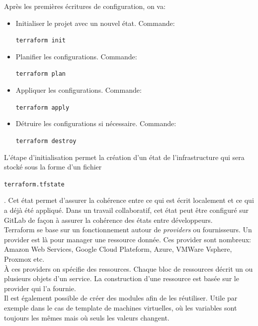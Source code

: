 \documentclass[12pt, a4paper, twoside]{article}
\begin{document}
Après les premières écritures de configuration, on va:
\begin{itemize}
    \item Initialiser le projet avec un nouvel état. Commande: \begin{code}\texttt{terraform init}\end{code}
    \item Planifier les configurations. Commande: \begin{code}\texttt{terraform plan}\end{code}
    \item Appliquer les configurations. Commande: \begin{code}\texttt{terraform apply}\end{code}
    \item Détruire les configurations si nécessaire. Commande: \begin{code}\texttt{terraform destroy}\end{code}
\end{itemize}

L'étape d'initialisation permet la création d'un état de l'infrastructure qui sera stocké sous la forme d'un fichier \begin{code}\texttt{terraform.tfstate}\end{code}. 
Cet état permet d'assurer la cohérence entre ce qui est écrit localement et ce qui a déjà été appliqué. 
Dans un travail collaboratif, cet état peut être configuré sur \gls{GitLab} de façon à assurer la cohérence des états entre développeurs. \\

\gls{Terraform} se base sur un fonctionnement autour de \textit{providers} ou fournisseurs. 
Un provider est là pour manager une ressource donnée. 
Ces provider sont nombreux: Amazon Web Services, Google Cloud Plateform, Azure, VMWare Vsphere, \gls{Proxmox} etc.\\

À ces providers on spécifie des ressources. 
Chaque bloc de ressources décrit un ou plusieurs objets d'un service. 
La construction d'une ressource est basée sur le provider qui l'a fournie.\\

Il est également possible de créer des modules afin de les réutiliser. 
Utile par exemple dans le cas de template de machines virtuelles, où les variables sont toujours les mêmes mais où seuls les valeurs changent.

\newpage
\end{document}
